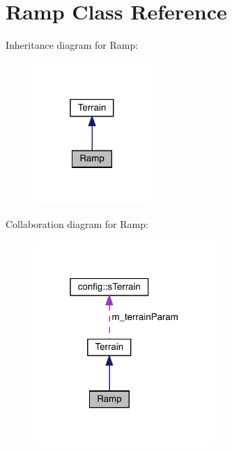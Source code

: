 \hypertarget{class_ramp}{}\section{Ramp Class Reference}
\label{class_ramp}


Inheritance diagram for Ramp\+:\nopagebreak
\begin{figure}[H]
\begin{center}
\leavevmode
\includegraphics[width=127pt]{class_ramp__inherit__graph}
\end{center}
\end{figure}


Collaboration diagram for Ramp\+:\nopagebreak
\begin{figure}[H]
\begin{center}
\leavevmode
\includegraphics[width=196pt]{class_ramp__coll__graph}
\end{center}
\end{figure}
